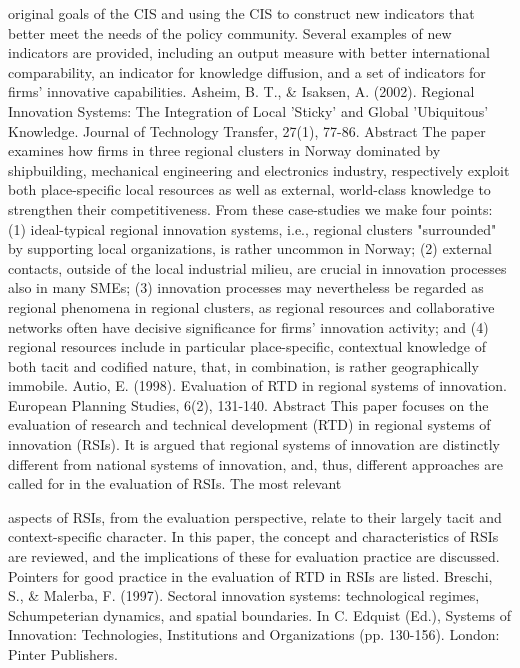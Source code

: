 \documentclass[a4paper,11pt]{article}
\begin{document}
original goals of the CIS and using the CIS to construct new indicators that better meet the needs of the policy community. Several examples of new indicators are provided, including an output measure with better international comparability, an indicator for knowledge diffusion, and a set of indicators for firms’ innovative capabilities.
Asheim, B. T., & Isaksen, A. (2002). Regional Innovation Systems: The Integration of Local 'Sticky' and Global 'Ubiquitous' Knowledge. Journal of Technology Transfer, 27(1), 77-86.
Abstract
The paper examines how firms in three regional clusters in Norway dominated by shipbuilding, mechanical engineering and electronics industry, respectively exploit both place-specific local resources as well as external, world-class knowledge to strengthen their competitiveness. From these case-studies we make four points: (1) ideal-typical regional innovation systems, i.e., regional clusters "surrounded" by supporting local organizations, is rather uncommon in Norway; (2) external contacts, outside of the local industrial milieu, are crucial in innovation processes also in many SMEs; (3) innovation processes may nevertheless be regarded as regional phenomena in regional clusters, as regional resources and collaborative networks often have decisive significance for firms' innovation activity; and (4) regional resources include in particular place-specific, contextual knowledge of both tacit and codified nature, that, in combination, is rather geographically immobile.
Autio, E. (1998). Evaluation of RTD in regional systems of innovation. European Planning Studies, 6(2), 131-140.
Abstract
This paper focuses on the evaluation of research and technical development (RTD) in regional systems of innovation (RSIs). It is argued that regional systems of innovation are distinctly different from national systems of innovation, and, thus, different approaches are called for in the evaluation of RSIs. The most relevant
 


aspects of RSIs, from the evaluation perspective, relate to their largely tacit and context-specific character. In this paper, the concept and characteristics of RSIs are reviewed, and the implications of these for evaluation practice are discussed. Pointers for good practice in the evaluation of RTD in RSIs are listed.
Breschi, S., & Malerba, F. (1997). Sectoral innovation systems: technological regimes, Schumpeterian dynamics, and spatial boundaries. In C. Edquist (Ed.), Systems of Innovation: Technologies, Institutions and Organizations (pp. 130-156).
London: Pinter Publishers.
\end{document}
